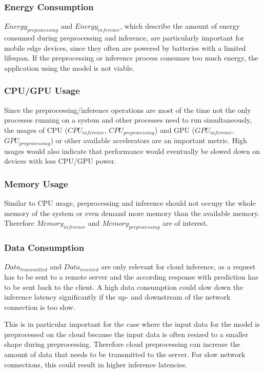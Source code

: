 \subsubsection{Energy Consumption}
$Energy_{preprocessing}$ and $Energy_{inference}$, which describe the amount of energy consumed during preprocessing and inference, are particularly important for mobile edge devices, since they often are powered by batteries with a limited lifespan. If the preprocessing or inference process consumes too much energy, the application using the model is not viable.


\subsubsection{CPU/GPU Usage}
Since the preprocessing/inference operations are most of the time not the only processes running on a system and other processes need to run simultaneously, the usages of CPU ($CPU_{inference}$, $CPU_{preprocessing}$) and GPU ($GPU_{inference}$, $GPU_{preprocessing}$) or other available accelerators are an important metric.
High usages would also indicate that performance would eventually be slowed down on devices with less CPU/GPU power.


\subsubsection{Memory Usage}
Similar to CPU usage, preprocessing and inference should not occupy the whole memory of the system or even demand more memory than the available memory. Therefore $Memory_{inference}$ and $Memory_{preprocessing}$ are of interest.

\subsubsection{Data Consumption}
$Data_{transmitted}$ and $Data_{received}$ are only relevant for cloud inference, as a request has to be sent to a remote server and the according response with prediction has to be sent back to the client. A high data consumption could slow down the inference latency significantly if the up- and downstream of the network connection is too slow. 

This is in particular important for the case where the input data for the model is preprocessed on the cloud because the input data is often resized to a smaller shape during preprocessing. Therefore cloud preprocessing can increase the amount of data that needs to be transmitted to the server. For slow network connections, this could result in higher inference latencies.

